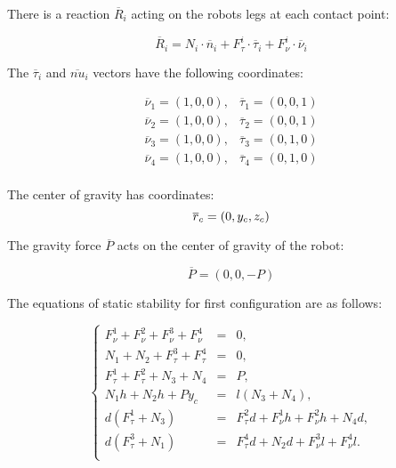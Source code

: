 \documentclass{ws-procs9x6}
\begin{document}
There is a reaction $\overline{R}_i$ acting on the robots legs at each contact point:

\begin{equation}
\overline{R}_i =  N_i\cdot\overline{n}_i+F^i_\tau\cdot\overline{\tau}_i+F^i_\nu\cdot\overline{\nu}_i
\end{equation}

The $\overline{\tau}_i$ and $\overline{nu}_i$ vectors have the following coordinates:

\begin{equation}
\begin{array}{ccc}
  \overline{\nu}_1 = (1,0,0), & \overline{\tau}_1 = (0,0,1)\\
  \overline{\nu}_2 = (1,0,0), & \overline{\tau}_2 = (0,0,1)\\
  \overline{\nu}_3 = (1,0,0), & \overline{\tau}_3 = (0,1,0)\\
  \overline{\nu}_4 = (1,0,0), & \overline{\tau}_4 = (0,1,0)\\
\end{array}
\end{equation}

The center of gravity has coordinates:
\begin{equation}
  \overline{r}_c = (0,y_c,z_c)\\
\end{equation}

The gravity force $\overline{P}$ acts on the center of gravity of the robot:

\begin{equation}
\overline{P} = (0,0,-P)
\end{equation}

The equations of static stability for first configuration are as follows:

\begin{equation}
\label{eq:case1_initial}
\left\{
  \begin{array}{rcl}
    F_\nu^1 + F_\nu^2 + F_\nu^3 + F_\nu^4 &=& 0, \\
    N_1 + N_2 + F_\tau^3 + F_\tau^4 &=& 0, \\
    F_\tau^1 + F_\tau^2 + N_3 + N_4 &=& P, \\
    N_1h + N_2h + Py_c &=& l(N_3 + N_4), \\
    d(F_\tau^1 + N_3) &=& F_\tau^2d + F_\nu^1h + F_\nu^2h + N_4d, \\
    d(F_\tau^3 + N_1) &=& F_\tau^4d + N_2d +F_\nu^3l + F_\nu^4l.\\
  \end{array}
\right.
\end{equation}
\end{document}
